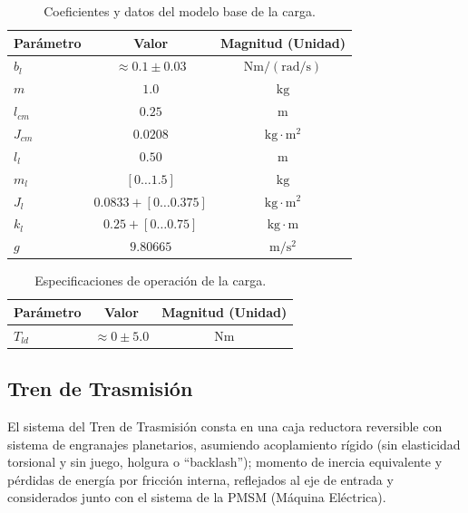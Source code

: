 \documentclass[blue,fullpaper]{ludusofficial}  %
\begin{document}
\begin{table}[!htbp]
    \centering
    \caption{Coeficientes y datos del modelo base de la carga.}
    \label{tab:parametros_carga}
    \begin{tabular}{lcc}
        \hline
        \textbf{Parámetro} & \textbf{Valor} & \textbf{Magnitud (Unidad)} \\
        \hline
        $b_l$ & $\approx 0.1 \pm 0.03$ & $\mathrm{Nm / (rad/s)}$ \\
        $m$ & $1.0$ & $\mathrm{kg}$ \\
        $l_{cm}$ & $0.25$ & $\mathrm{m}$ \\
        $J_{cm}$ & $0.0208$ & $\mathrm{kg \cdot m^{2}}$ \\
        $l_l$ & $0.50$ & $\mathrm{m}$ \\
        $m_l$ & $[0 \dots 1.5]$ & $\mathrm{kg}$ \\
        $J_l$ & $0.0833 + [0 \dots 0.375]$ & $\mathrm{kg \cdot m^{2}}$ \\
        $k_l$ & $0.25 + [0 \dots 0.75]$ & $\mathrm{kg \cdot m}$ \\
        $g$ & $9.80665$ & $\mathrm{m/s^2}$ \\
        \hline
    \end{tabular}
\end{table}

\begin{table}[htbp]
    \centering
    \caption{Especificaciones de operación de la carga.}
    \label{tab:parametros_carga}
    \begin{tabular}{lcc}
        \hline
        \textbf{Parámetro} & \textbf{Valor} & \textbf{Magnitud (Unidad)} \\
        \hline
        $T_{ld}$ & $\approx 0 \pm 5.0$ & $\mathrm{Nm}$ \\
        \hline
    \end{tabular}
\end{table}


\subsection{Tren de Trasmisión}

El sistema del Tren de Trasmisión consta en una caja reductora reversible con sistema de engranajes planetarios, asumiendo acoplamiento rígido (sin elasticidad torsional y sin juego, holgura o “backlash”); momento de inercia equivalente y pérdidas de energía por fricción interna, reflejados al eje de entrada y considerados junto con el sistema de la PMSM (Máquina Eléctrica).
\end{document}
